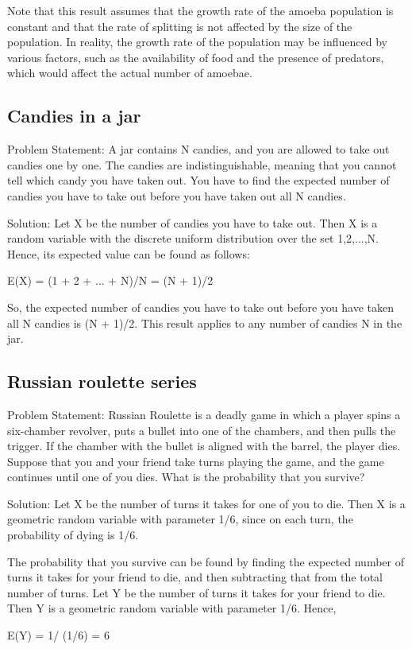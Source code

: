 \documentclass[12pt, a4paper, oneside]{article}
\begin{document}
Note that this result assumes that the growth rate of the amoeba population is constant and that the rate of splitting is not affected by the size of the population. In reality, the growth rate of the population may be influenced by various factors, such as the availability of food and the presence of predators, which would affect the actual number of amoebae.
\subsection{ Candies in a jar }
Problem Statement:
A jar contains N candies, and you are allowed to take out candies one by one. The candies are indistinguishable, meaning that you cannot tell which candy you have taken out. You have to find the expected number of candies you have to take out before you have taken out all N candies.

Solution:
Let X be the number of candies you have to take out. Then X is a random variable with the discrete uniform distribution over the set {1,2,...,N}. Hence, its expected value can be found as follows:

E(X) = (1 + 2 + ... + N)/N = (N + 1)/2

So, the expected number of candies you have to take out before you have taken all N candies is (N + 1)/2. This result applies to any number of candies N in the jar.
\subsection{ Russian roulette series }
Problem Statement:
Russian Roulette is a deadly game in which a player spins a six-chamber revolver, puts a bullet into one of the chambers, and then pulls the trigger. If the chamber with the bullet is aligned with the barrel, the player dies. Suppose that you and your friend take turns playing the game, and the game continues until one of you dies. What is the probability that you survive?

Solution:
Let X be the number of turns it takes for one of you to die. Then X is a geometric random variable with parameter 1/6, since on each turn, the probability of dying is 1/6.

The probability that you survive can be found by finding the expected number of turns it takes for your friend to die, and then subtracting that from the total number of turns. Let Y be the number of turns it takes for your friend to die. Then Y is a geometric random variable with parameter 1/6. Hence,

E(Y) = 1/ (1/6) = 6
\end{document}
